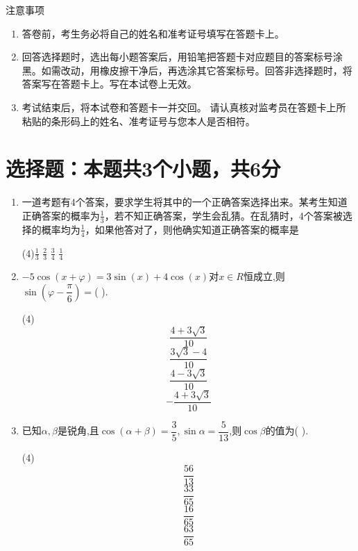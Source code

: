 \documentclass[12pt,twoside,space]{ctexart}
\begin{document}
\juemi
{}
{\heiti 注意事项}
\begin{enumerate}[itemsep=-0.3em,topsep=0pt]
\item 答卷前，考生务必将自己的姓名和准考证号填写在答题卡上。
\item 回答选择题时，选出每小题答案后，用铅笔把答题卡对应题目的答案标号涂黑。如需改动，用橡皮擦干净后，再选涂其它答案标号。回答非选择题时，将答案写在答题卡上。写在本试卷上无效。
\item 考试结束后，将本试卷和答题卡一并交回。
	请认真核对监考员在答题卡上所粘贴的条形码上的姓名、准考证号与您本人是否相符。
\end{enumerate}
\section{选择题：本题共3个小题，共6分}
\begin{enumerate}[itemsep=0.2em,topsep=0pt]
\item
一道考题有4个答案，要求学生将其中的一个正确答案选择出来。某考生知道正确答案的概率为$\frac{1}{3}$，若不知正确答案，学生会乱猜。在乱猜时，4个答案被选择的概率均为$\frac{1}{4}$，如果他答对了，则他确实知道正确答案的概率是
\begin{tasks}(4)\task $\frac{1}{3}$ \task $\frac{2}{3}$ \task $\frac{3}{4}$ \task $\frac{1}{4}$ 
\end{tasks}
\item
$-5\cos(x+\varphi)=3\sin(x)+4\cos(x)$对$x\in R$恒成立,则$\sin(\varphi-\dfrac{\pi}{6})=$( ).
\begin{tasks}(4)\task $$\dfrac{4+3\sqrt{3}}{10}$$ \task $$\dfrac{3\sqrt{3}-4}{10}$$ \task $$\dfrac{4-3\sqrt{3}}{10}$$ \task $$-\dfrac{4+3\sqrt{3}}{10}$$ 
\end{tasks}
\item
已知$\alpha,\beta$是锐角,且$\cos(\alpha+\beta)=\dfrac{3}{5},\sin{\alpha}=\dfrac{5}{13}$,则$\cos{\beta}$的值为( ).
\begin{tasks}(4)\task $$\dfrac{56}{13}$$ \task $$\dfrac{33}{65}$$ \task $$\dfrac{16}{65}$$ \task $$\dfrac{63}{65}$$ 
\end{tasks}
\end{enumerate}
\end{document}
